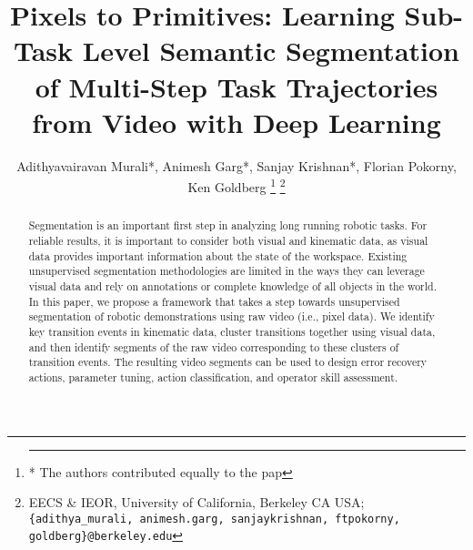 \documentclass[letterpaper, 10 pt, conference]{ieeeconf}
\title{\LARGE \bf
Pixels to Primitives: Learning Sub-Task Level Semantic Segmentation \\
of Multi-Step Task Trajectories from Video with Deep Learning }
\author{%
Adithyavairavan Murali*, Animesh Garg*, Sanjay Krishnan*, Florian Pokorny, Ken Goldberg
\thanks{\hrule \vspace{5pt} * The authors contributed equally to the pap}%
\thanks{EECS \& IEOR, University of California, Berkeley CA USA; \texttt{\{adithya\_murali, animesh.garg, sanjaykrishnan, ftpokorny, goldberg\}@berkeley.edu}}%
}
\begin{document}
\maketitle

\begin{abstract}
Segmentation is an important first step in analyzing long running robotic tasks. For reliable results, it is important to consider both visual and kinematic data, as visual data provides important information about the state of the workspace. 
Existing unsupervised segmentation methodologies are limited in the ways they can leverage visual data and rely on annotations or complete knowledge of all objects in the world. In this paper, we propose a framework that takes a step towards unsupervised segmentation of robotic demonstrations using raw video (i.e., pixel data). 
We identify key transition events in kinematic data, cluster transitions together using visual data, and then identify segments of the raw video corresponding to these clusters of transition events. 
The resulting video segments can be used to design error recovery actions, parameter tuning, action classification, 
and operator skill assessment. 
\end{abstract} 












\end{document}
